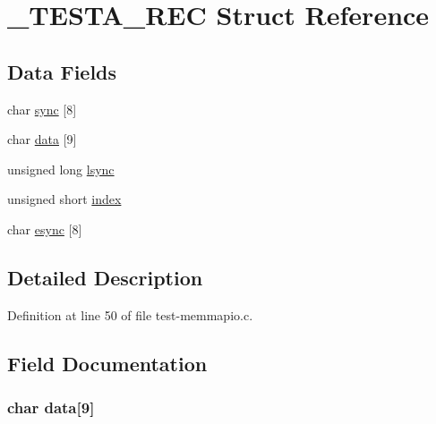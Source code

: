\hypertarget{struct___t_e_s_t_a___r_e_c}{\section{\-\_\-\-T\-E\-S\-T\-A\-\_\-\-R\-E\-C Struct Reference}
\label{struct___t_e_s_t_a___r_e_c}
}
\subsection*{Data Fields}
\begin{DoxyCompactItemize}
\item 
char \hyperlink{struct___t_e_s_t_a___r_e_c_adb9f0b7ac1cc6c4d8ffbaf504da8a1f1}{sync} \mbox{[}8\mbox{]}
\item 
char \hyperlink{struct___t_e_s_t_a___r_e_c_a09e06bf8115ec14f5d805fb7dc8a3a20}{data} \mbox{[}9\mbox{]}
\item 
unsigned long \hyperlink{struct___t_e_s_t_a___r_e_c_a7173bc263294f95c40c8bc5aab49a914}{lsync}
\item 
unsigned short \hyperlink{struct___t_e_s_t_a___r_e_c_aeea7950719aa0c034360149db761ae52}{index}
\item 
char \hyperlink{struct___t_e_s_t_a___r_e_c_ada0ff0fb7bd89f61b5bbf3d51a56a5ce}{esync} \mbox{[}8\mbox{]}
\end{DoxyCompactItemize}


\subsection{Detailed Description}


Definition at line 50 of file test-\/memmapio.\-c.



\subsection{Field Documentation}
\hypertarget{struct___t_e_s_t_a___r_e_c_a09e06bf8115ec14f5d805fb7dc8a3a20}{
\subsubsection[{data}]{\setlength{\rightskip}{0pt plus 5cm}char data\mbox{[}9\mbox{]}}}\label{struct___t_e_s_t_a___r_e_c_a09e06bf8115ec14f5d805fb7dc8a3a20}


